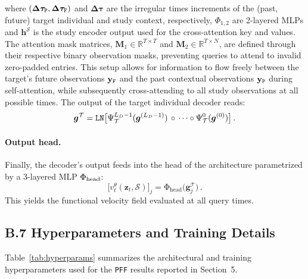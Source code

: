 where $(\bm\Delta\bm\tau_{\tt P},\bm\Delta\bm\tau_{\tt F})$ and $\bm\Delta\bm\tau$ are the irregular times increments of the (past, future) target individual and study context, respectively, $\Phi_{1,2}$ are 2-layered MLPs and $\bm{h}^\mathcal{S}$ is the study encoder output used for the cross-attention key and values. The attention mask matrices, $\bm M_1\in {\mathbb{R}^{T\times T}}$ and $\bm M_2\in {\mathbb{R}^{T\times N}}$, are defined through their respective binary observation masks, preventing queries to attend to invalid zero-padded entries. This setup allows for information to flow freely between the target's future observations $\bf{y}_{\tt F}$ and the past contextual observations $\bf{y}_{\tt P}$ during self-attention, while subsequently cross-attending to all study observations at all possible times. The output of the target individual decoder reads:
\begin{equation}
\bm g^{\mathcal T} = {\tt LN}\bigl[\Psi^{L_D-1}_\mathcal{T}(\bm g^{(L_D-1)})\,\circ\,\cdots\circ\Psi^0_\mathcal{T}(\bm g^{(0)})\bigr]\,.
\end{equation}

\paragraph{Output head.} Finally, the decoder's output feeds into the head of the architecture parametrized by a 3-layered MLP $\Phi_{\rm head}$:
\begin{equation}
    \bigl[v^\theta_t(\mathbf{z}_t,\mathcal{S})\bigr]_j
    = \mathrm{\Phi}_{\mathrm{head}}\bigl(\bm g^{\mathcal{T}}_j\bigr)\,.
    \label{eq:head}
\end{equation}
This yields the functional velocity field evaluated at all query times.


\subsection{B.7 \quad Hyperparameters and Training Details}
\label{app:hyperparams}

Table~\ref{tab:hyperparams} summarizes the architectural and training
hyperparameters used for the \texttt{PFF} results reported in Section~5.

